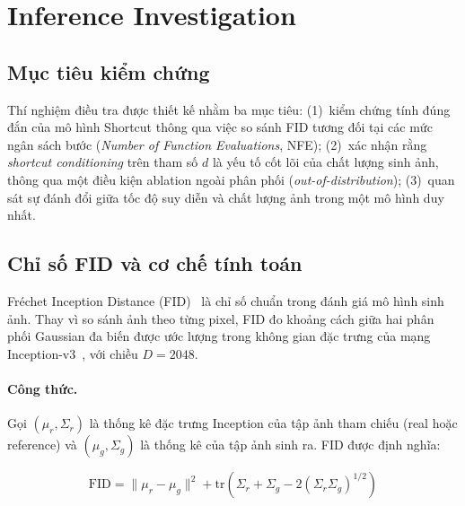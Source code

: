 
\section{Inference Investigation}
\label{sec:inference}

\subsection{Mục tiêu kiểm chứng}

Thí nghiệm điều tra được thiết kế nhằm ba mục tiêu: (1)~kiểm chứng tính đúng đắn của mô hình Shortcut thông qua việc so sánh FID tương đối tại các mức ngân sách bước (\textit{Number of Function Evaluations}, NFE); (2)~xác nhận rằng \textit{shortcut conditioning} trên tham số $d$ là yếu tố cốt lõi của chất lượng sinh ảnh, thông qua một điều kiện ablation ngoài phân phối (\textit{out-of-distribution}); (3)~quan sát sự đánh đổi giữa tốc độ suy diễn và chất lượng ảnh trong một mô hình duy nhất.

\subsection{Chỉ số FID và cơ chế tính toán}
\label{sec:fid}

Fréchet Inception Distance (FID)~\cite{heusel2017gans} là chỉ số chuẩn trong đánh giá mô hình sinh ảnh. Thay vì so sánh ảnh theo từng pixel, FID đo khoảng cách giữa hai phân phối Gaussian đa biến được ước lượng trong không gian đặc trưng của mạng Inception-v3~\cite{szegedy2016rethinking}, với chiều $D = 2048$.

\paragraph{Công thức.}
Gọi $(\mu_r, \Sigma_r)$ là thống kê đặc trưng Inception của tập ảnh tham chiếu (real hoặc reference) và $(\mu_g, \Sigma_g)$ là thống kê của tập ảnh sinh ra. FID được định nghĩa:

\begin{equation}
    \mathrm{FID} = \|\mu_r - \mu_g\|^2
    + \mathrm{tr}\!\left(\Sigma_r + \Sigma_g
      - 2\left(\Sigma_r \Sigma_g\right)^{1/2}\right)
    \label{eq:fid}
\end{equation}

